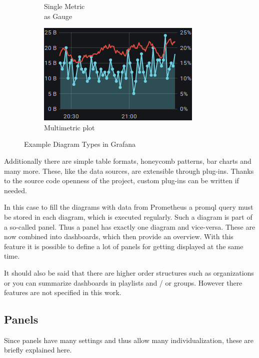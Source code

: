 \begin{figure}[ht]
\begin{subfigure}{.25\textwidth}
		\captionsetup{justification=centering}
		\caption{Single Metric\\as Gauge}
		\label{fig:sfig2}
	\end{subfigure}%
	\begin{subfigure}{.5\textwidth}
		\centering
		\includegraphics[width=.8\linewidth]{assets/screenshots/Screenshot_2020-12-08 Grafana Play Home - Grafana(2).png}
		\captionsetup{justification=centering}
		\caption{Multimetric plot}
		\label{fig:sfig2}
	\end{subfigure}
	\caption{Example Diagram Types in Grafana}
	\label{fig:fig}
\end{figure}
Additionally there are simple table formats, honeycomb patterns, bar charts and many more. These, like the data sources, are extensible through plug-ins. Thanks to the source code openness of the project, custom plug-ins can be written if needed.

In this case to fill the diagrams with data from Prometheus a \gls{promql} query must be stored in each diagram, which is executed regularly. Such a diagram is part of a so-called panel. Thus a panel has exactly one diagram and vice-versa. These are now combined into dashboards, which then provide an overview. With this feature it is possible to define a lot of panels for getting displayed at the same time.

It should also be said that there are higher order structures such as organizations or you can summarize dashboards in playlists and / or groups. However there features are not specified in this work.

\subsection{Panels}
Since panels have many settings and thus allow many individualization, these are briefly explained here.


